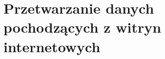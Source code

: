 \chapter{Przetwarzanie danych pochodzących z witryn internetowych}
\label{cha:przetwarzanieDanych}


